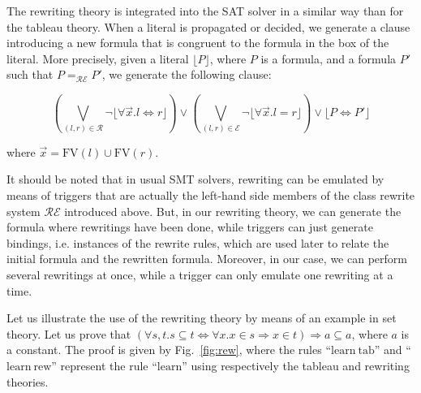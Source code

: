 The rewriting theory is integrated into the SAT solver in a similar way than for
the tableau theory. When a literal is propagated or decided, we generate a
clause introducing a new formula that is congruent to the formula in the box of
the literal. More precisely, given a literal $\lfloor{}P\rfloor$, where $P$ is a
formula, and a formula $P'$ such that $P=_\mathcal{RE}P'$, we generate the
following clause:

$$\left(\bigvee_{(l,r)\in\mathcal{R}}
\neg\lfloor\forall{}\vec{x}.l\Leftrightarrow{}r\rfloor\right)\lor
\left(\bigvee_{(l,r)\in\mathcal{E}}\neg\lfloor\forall{}\vec{x}.l=r\rfloor\right)\lor
\lfloor{}P\Leftrightarrow{}P'\rfloor$$

where $\vec{x}=\mathrm{FV}(l)\cup\mathrm{FV}(r)$.

It should be noted that in usual SMT solvers, rewriting can be emulated by means
of triggers that are actually the left-hand side members of the class rewrite
system $\mathcal{RE}$ introduced above. But, in our rewriting theory, we can
generate the formula where rewritings have been done, while triggers can just
generate bindings, i.e. instances of the rewrite rules, which are used later to
relate the initial formula and the rewritten formula. Moreover, in our case, we
can perform several rewritings at once, while a trigger can only emulate one
rewriting at a time.

Let us illustrate the use of the rewriting theory by means of an example in set
theory. Let us prove that
$(\forall{}s,t.s\subseteq{}t\Leftrightarrow{}\forall{}x.x\in{}s\Rightarrow{}
x\in{}t)\Rightarrow{}a\subseteq{}a$, where $a$ is a constant. The proof is given
by Fig.~\ref{fig:rew}, where the rules ``$\mathrm{learn~tab}$'' and
``$\mathrm{learn~rew}$'' represent the rule ``$\mathrm{learn}$'' using
respectively the tableau and rewriting theories.

